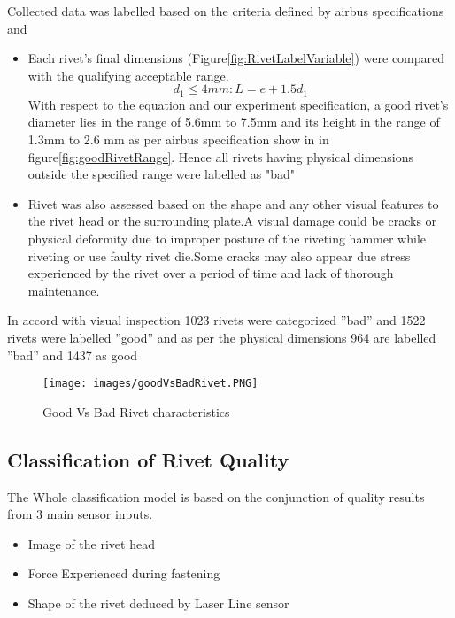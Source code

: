 \documentclass{article}
\begin{document}
Collected data was labelled based on the criteria defined by airbus specifications \cite{airbusRivetSpecification} and \cite{FAA_visual_Inspection}

\begin{itemize}
    \item  Each rivet's final dimensions (Figure\ref{fig:RivetLabelVariable}) were compared with the qualifying acceptable range.
\\ \[ d_1 \leq 4mm :  L = e + 1.5d_1 \]
With respect to the equation and our experiment specification, a good rivet's diameter lies in the range of 5.6mm to 7.5mm and its height in the range of 1.3mm to 2.6 mm as per airbus specification show in in figure\ref{fig:goodRivetRange}. Hence all rivets having physical dimensions outside the specified range were labelled as "bad" 

\item Rivet was also assessed based on the shape and any other visual features to the rivet head or the surrounding plate.A visual damage could be cracks or physical deformity due to improper posture of the riveting hammer while riveting or use faulty rivet die.Some cracks may also appear due stress experienced by the rivet over a period of time and lack of thorough maintenance.
\end{itemize}

In  accord  with  visual  inspection  1023  rivets  were  categorized ”bad” and 1522 rivets were labelled ”good” and as per the physical dimensions 964 are labelled ”bad” and 1437 as good

\begin{figure}[H]
    \centering
    \texttt{[image: images/goodVsBadRivet.PNG]}
    \caption{Good Vs Bad Rivet characteristics}
    \label{fig:goodVsBadRivet}
\end{figure}

\subsection{Classification of Rivet Quality}

The Whole classification model is based on the conjunction of quality results from 3 main sensor inputs.

\begin{itemize}
    \item Image of the rivet head
    \item Force Experienced during fastening
    \item Shape of the rivet deduced by Laser Line sensor
\end{itemize}
\end{document}
